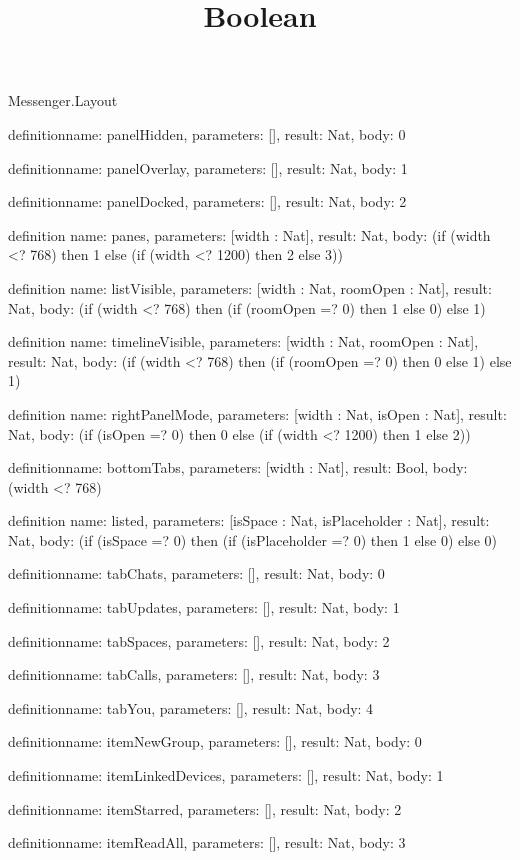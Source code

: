 \begin{lexlean}{Messenger.Layout}
\title{Boolean}
\begin{semanticmodule}
definition{name: panelHidden, parameters: [], result: Nat, body: 0}

definition{name: panelOverlay, parameters: [], result: Nat, body: 1}

definition{name: panelDocked, parameters: [], result: Nat, body: 2}

definition{
  name: panes,
  parameters: [width : Nat],
  result: Nat,
  body: (if (width <? 768) then 1 else (if (width <? 1200) then 2 else 3))
}

definition{
  name: listVisible,
  parameters: [width : Nat, roomOpen : Nat],
  result: Nat,
  body: (if (width <? 768) then (if (roomOpen =? 0) then 1 else 0) else 1)
}

definition{
  name: timelineVisible,
  parameters: [width : Nat, roomOpen : Nat],
  result: Nat,
  body: (if (width <? 768) then (if (roomOpen =? 0) then 0 else 1) else 1)
}

definition{
  name: rightPanelMode,
  parameters: [width : Nat, isOpen : Nat],
  result: Nat,
  body: (if (isOpen =? 0) then 0 else (if (width <? 1200) then 1 else 2))
}

definition{name: bottomTabs, parameters: [width : Nat], result: Bool, body: (width <? 768)}

definition{
  name: listed,
  parameters: [isSpace : Nat, isPlaceholder : Nat],
  result: Nat,
  body: (if (isSpace =? 0) then (if (isPlaceholder =? 0) then 1 else 0) else 0)
}

definition{name: tabChats, parameters: [], result: Nat, body: 0}

definition{name: tabUpdates, parameters: [], result: Nat, body: 1}

definition{name: tabSpaces, parameters: [], result: Nat, body: 2}

definition{name: tabCalls, parameters: [], result: Nat, body: 3}

definition{name: tabYou, parameters: [], result: Nat, body: 4}

definition{name: itemNewGroup, parameters: [], result: Nat, body: 0}

definition{name: itemLinkedDevices, parameters: [], result: Nat, body: 1}

definition{name: itemStarred, parameters: [], result: Nat, body: 2}

definition{name: itemReadAll, parameters: [], result: Nat, body: 3}


\end{semanticmodule}
\end{lexlean}
